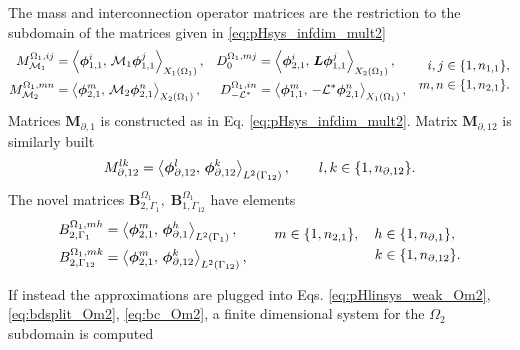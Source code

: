 The mass and interconnection operator matrices are the restriction to the subdomain of the matrices given in \eqref{eq:pHsys_infdim_mult2}
\begin{equation}
\begin{aligned}
{M}_{\mathcal{M}_1}^{\Omega_1, ij} &= \inner[X_1(\Omega_1)]{\bm{\phi}_{1, 1}^i}{\mathcal{M}_1\bm{\phi}_{1, 1}^j}, \\
{M}_{\mathcal{M}_2}^{\Omega_1, mn} &= \inner[X_2(\Omega_1)]{\bm{\phi}_{2, 1}^m}{\mathcal{M}_2\bm{\phi}_{2, 1}^n}, 
\end{aligned} \quad 
\begin{aligned}
{D}_{0}^{\Omega_1, mj} &= \inner[X_2(\Omega_1)]{\bm{\phi}_{2, 1}^i}{\bm{L}\bm{\phi}_{1, 1}^j}, \\
{D}_{-\mathcal{L}^*}^{\Omega_1, in} &= \inner[X_1(\Omega_1)]{\bm{\phi}_{1, 1}^m}{-\mathcal{L}^*\bm{\phi}_{2, 1}^n}, 
\end{aligned} \quad
\begin{aligned}
i,j &\in \{1,n_{1, 1}\}, \\
m,n &\in \{1,n_{2, 1}\}.
\end{aligned}
\end{equation} 
Matrices $\mathbf{M}_{\partial, 1}$ is constructed as in Eq. \eqref{eq:pHsys_infdim_mult2}. Matrix $\mathbf{M}_{\partial, 12}$ is similarly built 
\begin{equation}
{M}_{\partial, 12}^{lk} =\inner[L^2(\Gamma_{12})]{\bm{\phi}_{\partial, 12}^l}{\bm{\phi}_{\partial, {12}}^k}, \qquad l,k \in \{1,n_{\partial, 12}\}.
\end{equation}
The novel matrices  $\mathbf{B}_{2, \Gamma_1}^{\Omega_1}, \; \mathbf{B}_{1, \Gamma_{12}}^{\Omega_1}$ have elements
\begin{equation}
\begin{aligned}
{B}_{2, \Gamma_1}^{\Omega_1, mh} &= \inner[L^2(\Gamma_{1})]{\bm{\phi}_{2, 1}^m}{\bm{\phi}_{\partial, 1}^h}, \\
{B}_{2, \Gamma_{12}}^{\Omega_1, mk} &= \inner[L^2(\Gamma_{12})]{\bm{\phi}_{2, 1}^m}{\bm{\phi}_{\partial, 12}^k}, 
\end{aligned} \qquad 
\begin{aligned}
m \in \{1,n_{2, 1}\}, \quad h &\in \{1,n_{\partial, 1}\}, \\
k &\in \{1,n_{\partial, 12}\}.
\end{aligned}
\end{equation} 


If instead the approximations are plugged into  Eqs. \ref{eq:pHlinsys_weak_Om2}, \ref{eq:bdsplit_Om2}, \ref{eq:bc_Om2}, a finite dimensional system for the $\Omega_2$ subdomain is computed

